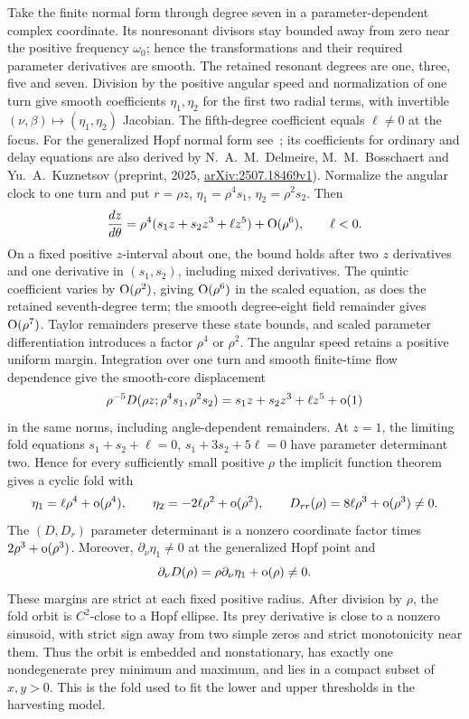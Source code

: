 Take the finite normal form through degree
seven in a parameter-dependent complex coordinate. Its nonresonant
divisors stay bounded away from zero near the positive frequency
\(\omega_0\); hence the transformations and their required parameter
derivatives are smooth. The retained resonant degrees are one,
three, five and seven. Division by the positive angular speed and
normalization of one turn give smooth coefficients \(\eta_1,\eta_2\)
for the first two radial terms, with invertible
\((\nu,\beta)\mapsto(\eta_1,\eta_2)\) Jacobian. The fifth-degree
coefficient equals \(\ell\ne0\) at the focus. For the generalized Hopf normal
form see~\cite{kuznetsov2023}; its coefficients for ordinary and delay
equations are also derived by N.~A.~M.~Delmeire, M.~M.~Bosschaert and
Yu.~A.~Kuznetsov (preprint, 2025,
\href{https://arxiv.org/abs/2507.18469v1}{arXiv:2507.18469v1}).
Normalize the angular clock to one turn and put
\(r=\rho z\), \(\eta_1=\rho^4s_1\), \(\eta_2=\rho^2s_2\).
Then
\begin{equation}\label{eq:harvesting:weighted-flow}
 \frac{dz}{d\theta}
 =\rho^4(s_1z+s_2z^3+\ell z^5)+\mathrm{O}(\rho^6),\qquad \ell<0.
\end{equation}
On a fixed positive \(z\)-interval about one, the bound holds after
two \(z\) derivatives and one derivative in \((s_1,s_2)\), including
mixed derivatives. The quintic coefficient varies by \(\mathrm{O}(\rho^2)\),
giving \(\mathrm{O}(\rho^6)\) in the scaled equation, as does the retained
seventh-degree term; the smooth degree-eight field remainder gives
\(\mathrm{O}(\rho^7)\). Taylor remainders preserve these state bounds,
and scaled parameter differentiation introduces a factor \(\rho^4\)
or \(\rho^2\). The angular speed retains a positive uniform margin.
Integration over one turn and smooth finite-time flow dependence give
the smooth-core displacement
\begin{equation}\label{eq:harvesting:scaled-return}
 \rho^{-5}D(\rho z;\rho^4s_1,\rho^2s_2)
 =s_1z+s_2z^3+\ell z^5+\mathrm{o}(1)
\end{equation}
in the same norms, including angle-dependent remainders.
At \(z=1\), the limiting fold equations
\(s_1+s_2+\ell=0\), \(s_1+3s_2+5\ell=0\) have parameter
determinant two. Hence for every sufficiently small positive \(\rho\)
the implicit function theorem gives a cyclic fold with
\begin{equation}\label{eq:harvesting:fold-data}
 \eta_1=\ell\rho^4+\mathrm{o}(\rho^4),\qquad
 \eta_2=-2\ell\rho^2+\mathrm{o}(\rho^2),\qquad
 D_{rr}(\rho)=8\ell\rho^3+\mathrm{o}(\rho^3)\ne0.
\end{equation}
The \((D,D_r)\) parameter determinant is a nonzero
coordinate factor times \(2\rho^3+\mathrm{o}(\rho^3)\). Moreover,
\(\partial_\nu\eta_1\ne0\) at the generalized Hopf point and
\[
 \partial_\nu D(\rho)
 =\rho\partial_\nu\eta_1+\mathrm{o}(\rho)\ne0.
\]
These margins are strict at each fixed positive radius.
After division by \(\rho\), the fold orbit is \(C^2\)-close to a
Hopf ellipse. Its prey derivative is close to a nonzero sinusoid,
with strict sign away from two simple zeros and strict monotonicity
near them. Thus the orbit is embedded and nonstationary, has exactly
one nondegenerate prey minimum and maximum, and lies in a compact
subset of \(x,y>0\).
This is the fold used to fit the lower and upper thresholds in the
harvesting model.
